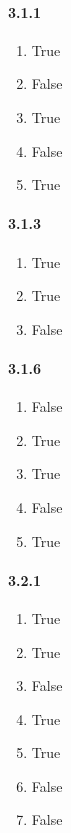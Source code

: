 \documentclass[11pt, letterpaper, twocolumn, fleqn]{article}
\begin{document}
    \paragraph{3.1.1} 
    \renewcommand{\labelenumi}{\alph{enumi}.}
    \begin{enumerate}
        \item True
        \item False
        \item True  
        \addtocounter{enumi}{2}
        \item False
        \item True
    \end{enumerate}
    
    \paragraph{3.1.3}
    \renewcommand{\labelenumi}{\alph{enumi}.}
    \begin{enumerate}
        \item True
        \item True
        \item False
    \end{enumerate}
    
    \paragraph{3.1.6}
    \renewcommand{\labelenumi}{\alph{enumi}.}
    \begin{enumerate}
        \item False
        \item True
        \item True
        \item False
        \item True
    \end{enumerate}
    
    \paragraph{3.2.1}
    \renewcommand{\labelenumi}{\alph{enumi}.}
    \begin{enumerate}
        \item True
        \item True
        \item False
        \addtocounter{enumi}{1}
        \item True
        \item True
        \addtocounter{enumi}{3}
        \item False
        \item False
    \end{enumerate}
    
\end{document}
